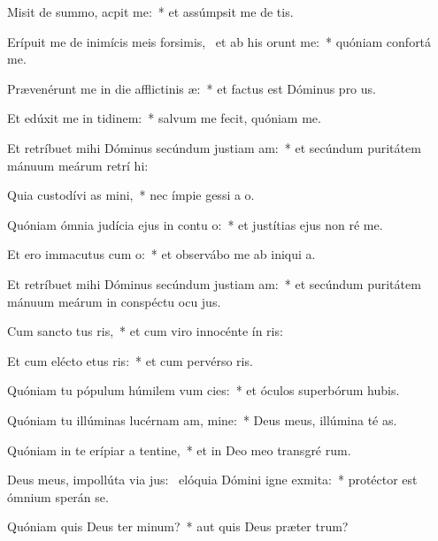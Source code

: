 \item Misit de summo,  acpit me:~* et assúmpsit me de  tis.
\item Erípuit me de inimícis meis forsimis,~\pscross{} et ab his  orunt me:~* quóniam confortá   me.
\item Prævenérunt me in die afflictinis æ:~* et factus est Dóminus pro us.
\item Et edúxit me in tidinem:~* salvum me fecit, quóniam  me.
\item Et retríbuet mihi Dóminus secúndum justiam am:~* et secúndum puritátem mánuum meárum retrí hi:
\item Quia custodívi as mini,~* nec ímpie gessi a  o.
\item Quóniam ómnia judícia ejus in contu o:~* et justítias ejus non ré  me.
\item Et ero immacutus cum o:~* et observábo me ab iniqui a.
\item Et retríbuet mihi Dóminus secúndum justiam am:~* et secúndum puritátem mánuum meárum in conspéctu ocu jus.
\item Cum sancto tus ris,~* et cum viro innocénte ín ris:
\item Et cum elécto etus ris:~* et cum pervérso ris.
\item Quóniam tu pópulum húmilem vum cies:~* et óculos superbórum hubis.
\item Quóniam tu illúminas lucérnam am, mine:~* Deus meus, illúmina té as.
\item Quóniam in te erípiar a tentine,~* et in Deo meo transgré rum.
\item Deus meus, impollúta via jus:~\pscross{} elóquia Dómini igne exmita:~* protéctor est ómnium sperán  se.
\item Quóniam quis Deus ter minum?~* aut quis Deus præter  trum?
